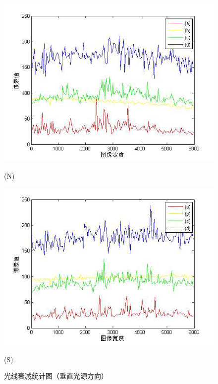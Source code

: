 \begin{figure}[htbp]
\begin{minipage}{0.48\linewidth}
\centerline{\includegraphics[width=1\linewidth]{figures/guangxianshuaijianduibitushuipings.png}}
\centerline{(N)}
\end{minipage}
\begin{minipage}{0.48\linewidth}
\centerline{\includegraphics[width=1\linewidth]{figures/guangxianshuaijianduibitushuipingn.png}}
\centerline{(S)}
\end{minipage}

\caption{光线衰减统计图（垂直光源方向）}
\label{fig:guangxiansunshichuizhi}
\vspace{-3mm}
\end{figure}

